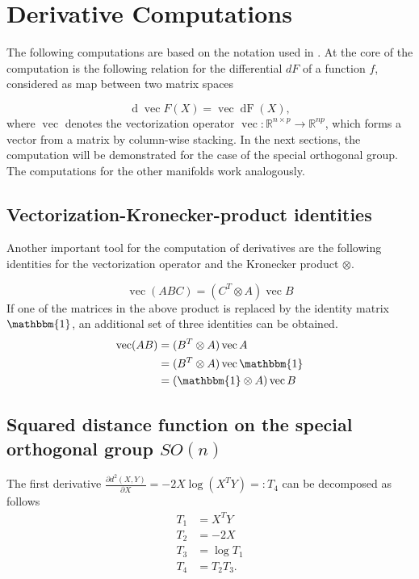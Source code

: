 \chapter{Derivative Computations}
\label{ap:derivative}

The following computations are based on the notation used in \cite{Magnus}. At the core of 
the computation is the following relation for the differential $dF$ of a function $f$, considered 
as map between two matrix spaces

\begin{equation}
\mathop{d}\operatorname{vec} F(X) =\operatorname{vec}\mathop{dF}(X),
\end{equation}
where $\operatorname{vec}$ denotes the vectorization operator $\operatorname{vec}:\mathbb{R}^{n\times p} \to \mathbb{R}^{np}$, which forms a vector from a matrix by column-wise stacking. In the next sections, the computation will be demonstrated for the case
of the special orthogonal group. The computations for the other manifolds work analogously.


\section{Vectorization-Kronecker-product identities}
Another important tool for the computation of derivatives are the following identities
for the vectorization operator and the Kronecker product $\otimes$.

\begin{equation}
\operatorname{vec}(ABC)=(C^T \otimes A)\operatorname{vec} B
\end{equation}
If one of the matrices in the above product is replaced by the identity matrix $\mathbbm{1}$,
an additional set of three identities can be obtained.
\begin{align}
\operatorname{vec}(AB)	&=(B^T \otimes A)\operatorname{vec} A\\
						&=(B^T \otimes A)\operatorname{vec} \mathbbm{1}\\
						&=(\mathbbm{1} \otimes A)\operatorname{vec} B\\
\end{align}

\section{Squared distance function on the special orthogonal group $SO(n)$}
The first derivative $\frac{\partial d^2(X,Y)}{\partial X} = -2X\log(X^TY) =: T_4$ can be decomposed as follows
\begin{align}
T_1 &= X^TY \\
T_2 &= -2X \\	
T_3 &= \log T_1\\  
T_4 &= T_2 T_3.
\end{align}

